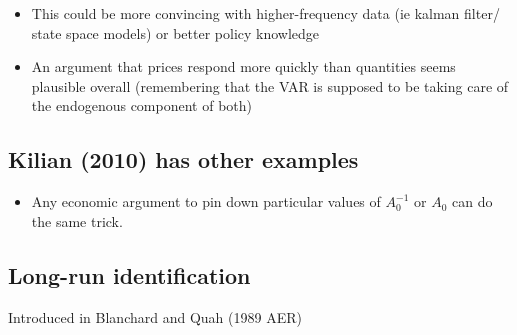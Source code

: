 \begin{itemize}
\item This could be more convincing with higher-frequency data (ie
  kalman filter/ state space models) or better policy knowledge
\item An argument that prices respond more quickly than quantities
  seems plausible overall (remembering that the VAR is supposed to be
  taking care of the endogenous component of both)
\end{itemize}

\subsection{Kilian (2010) has other examples}

\begin{itemize}
\item Any economic argument to pin down particular values of
  $A_0^{-1}$ or $A_0$ can do the same trick.
\end{itemize}

\subsection{Long-run identification}

Introduced in Blanchard and Quah (1989 AER)

